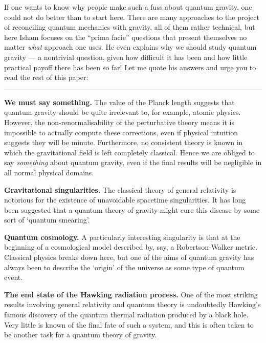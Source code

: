 \documentclass{article}
\def\tightlist{}
\renewcommand{\texttt}[1]{%
  \begingroup
  \ttfamily
  \begingroup\lccode`~=`/\lowercase{\endgroup\def~}{/\discretionary{}{}{}}%
  \begingroup\lccode`~=`[\lowercase{\endgroup\def~}{[\discretionary{}{}{}}%
  \begingroup\lccode`~=`.\lowercase{\endgroup\def~}{.\discretionary{}{}{}}%
  \catcode`/=\active\catcode`[=\active\catcode`.=\active
  \scantokens{#1\noexpand}%
  \endgroup
}
\begin{document}

If one wants to know why people make such a fuss about quantum gravity,
one could not do better than to start here. There are many approaches to
the project of reconciling quantum mechanics with gravity, all of them
rather technical, but here Isham focuses on the ``prima facie''
questions that present themselves no matter \emph{what} approach one
uses. He even explains why we should study quantum gravity --- a
nontrivial question, given how difficult it has been and how little
practical payoff there has been so far! Let me quote his answers and
urge you to read the rest of this paper:

\begin{center}\rule{0.5\linewidth}{0.5pt}\end{center}

\textbf{We must say something.} The value of the Planck length suggests
that quantum gravity should be quite irrelevant to, for example, atomic
physics. However, the non-renormalisability of the perturbative theory
means it is impossible to actually compute these corrections, even if
physical intuition suggests they will be minute. Furthermore, no
consistent theory is known in which the gravitational field is left
completely classical. Hence we are obliged to say \emph{something} about
quantum gravity, even if the final results will be negligible in all
normal physical domains.

\textbf{Gravitational singularities.} The classical theory of general
relativity is notorious for the existence of unavoidable spacetime
singularities. It has long been suggested that a quantum theory of
gravity might cure this disease by some sort of `quantum smearing'.

\textbf{Quantum cosmology.} A particularly interesting singularity is
that at the beginning of a cosmological model described by, say, a
Robertson-Walker metric. Classical physics breaks down here, but one of
the aims of quantum gravity has always been to describe the `origin' of
the universe as some type of quantum event.

\textbf{The end state of the Hawking radiation process.} One of the most
striking results involving general relativity and quantum theory is
undoubtedly Hawking's famous discovery of the quantum thermal radiation
produced by a black hole. Very little is known of the final fate of such
a system, and this is often taken to be another task for a quantum
theory of gravity.
\end{document}
